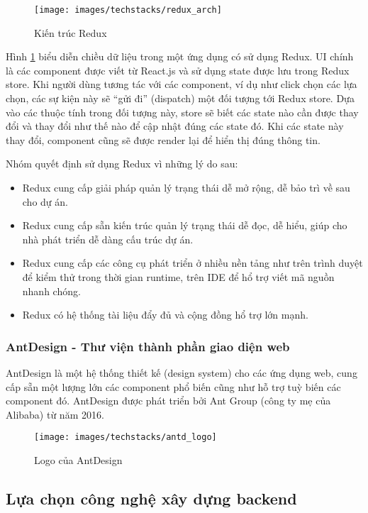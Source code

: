 \documentclass[../main.tex]{subfiles}
\begin{document}
	\begin{figure}[ht]
		\centering
		\texttt{[image: images/techstacks/redux\_arch]}
		\caption{Kiến trúc Redux}
		\label{fig:redux-arch}
	\end{figure}

	Hình \ref{fig:redux-arch} biểu diễn chiều dữ liệu trong một ứng dụng có sử dụng Redux. UI chính là các component
	được viết từ React.js và sử dụng state được lưu trong Redux store. Khi người dùng tương tác với các component, ví dụ
	như click chọn các lựa chọn, các sự kiện này sẽ ``gửi đi'' (dispatch) một đối tượng tới Redux store. Dựa vào các thuộc
	tính trong đối tượng này, store sẽ biết các state nào cần được thay đổi và thay đổi như thế nào để cập nhật đúng các
	state đó. Khi các state này thay đổi, component cũng sẽ được render lại để hiển thị đúng thông tin.

	Nhóm quyết định sử dụng Redux vì những lý do sau:

	\begin{itemize}
		\item Redux cung cấp giải pháp quản lý trạng thái dễ mở rộng, dễ bảo trì về sau cho dự án.
		\item Redux cung cấp sẵn kiến trúc quản lý trạng thái dễ đọc, dễ hiểu, giúp cho nhà phát triển dễ dàng cấu trúc dự
		án.
		\item Redux cung cấp các công cụ phát triển ở nhiều nền tảng như trên trình duyệt để kiểm thử trong thời gian
		runtime, trên IDE để hổ trợ viết mã nguồn nhanh chóng.
		\item Redux có hệ thống tài liệu đẩy đủ và cộng đồng hổ trợ lớn mạnh.
	\end{itemize}

	\subsubsection{AntDesign - Thư viện thành phần giao diện web}

	AntDesign là một hệ thống thiết kế (design system) cho các ứng dụng web, cung cấp sẵn một lượng lớn các component phổ
	biến cũng như hỗ trợ tuỳ biến các component đó. AntDesign được phát triển bởi Ant Group (công ty mẹ của Alibaba) từ
	năm 2016.

	\begin{figure}[ht]
		\centering
		\texttt{[image: images/techstacks/antd\_logo]}
		\caption{Logo của AntDesign}
		\label{fig:antd-logo}
	\end{figure}

	\subsection{Lựa chọn công nghệ xây dựng \Gls{backend}}
\end{document}
